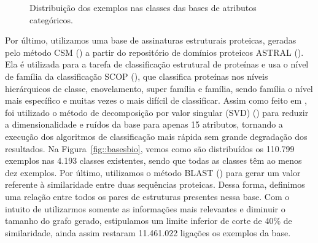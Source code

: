 \begin{figure}[h]

\caption{Distribuição dos exemplos nas classes das bases de atributos categóricos.}
\label{fig::basescategorias}
\end{figure}

Por último, utilizamos uma base de assinaturas estruturais proteicas, geradas pelo método \textsc{CSM} (\cite{dpires_bmc_2011}) a partir do repositório de domínios proteicos ASTRAL (\cite{Brenner00}).
Ela é utilizada para a tarefa de classificação estrutural de proteínas e usa o nível de família da classificação SCOP (\cite{SCOP95}), que classifica proteínas nos níveis hierárquicos de classe, enovelamento, super família e família, sendo família o nível mais específico e muitas vezes o mais difícil de classificar. Assim como feito em \cite{dpires_bmc_2011}, foi utilizado o método de decomposição por valor singular (\textsc{SVD}) (\cite{SVD}) para reduzir a dimensionalidade e ruídos da base para apenas 15 atributos, tornando a execução dos algoritmos de classificação mais rápida sem grande degradação dos resultados. 
Na Figura~\ref{fig::basesbio}, vemos como são distribuídos os 110.799 exemplos nas 4.193 classes existentes, sendo que todas as classes têm ao menos dez exemplos.
Por último, utilizamos o método \textsc{BLAST} (\cite{altschul90}) para gerar um valor referente à similaridade entre duas sequências proteicas. Dessa forma, definimos uma relação entre todos os pares de estruturas presentes nessa base. Com o intuito de utilizarmos somente as informações mais relevantes e diminuir o tamanho do grafo gerado, estipulamos um limite inferior de corte de 40\% de similaridade, ainda assim restaram 11.461.022 ligações os exemplos da base.

